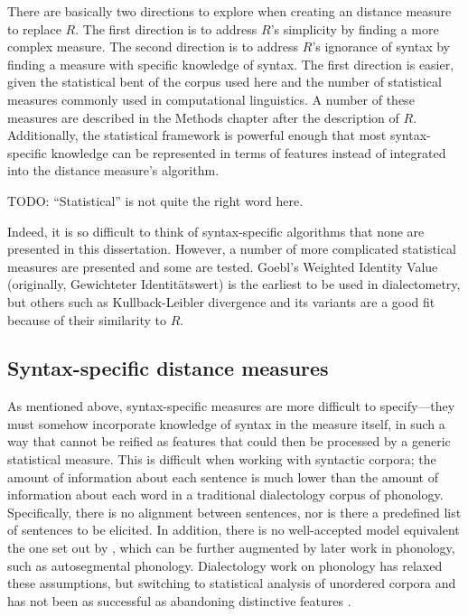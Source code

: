 There are basically two directions to explore when creating an
distance measure to replace $R$. The first direction is to address
$R$'s simplicity by finding a more complex measure. The second
direction is to address $R$'s ignorance of syntax by finding a measure
with specific knowledge of syntax. The first direction is easier,
given the statistical bent of the corpus used here and the number of
statistical measures commonly used in computational
linguistics. A number of these measures are described in the Methods
chapter after the description of $R$.
Additionally, the statistical framework is powerful
enough that most syntax-specific knowledge can be represented in terms
of features instead of integrated into the distance measure's
algorithm.

TODO: ``Statistical'' is not quite the right word here.

Indeed, it is so difficult to think of syntax-specific algorithms that
none are presented in this dissertation. However, a number of more
complicated statistical measures are presented and some are tested. Goebl's
Weighted Identity Value (originally, Gewichteter Identit\"atswert) is
the earliest to be used in dialectometry, but others such as
Kullback-Leibler divergence and its variants are a good fit because of
their similarity to $R$.

\subsection{Syntax-specific distance measures}

As mentioned above, syntax-specific measures are more difficult to
specify---they must somehow incorporate knowledge of syntax in the
measure itself, in such a way that cannot be reified as features that
could then be processed by a generic statistical measure. This is
difficult when working with syntactic corpora; the amount of
information about each sentence is much lower than the amount of
information about each word in a traditional dialectology corpus of
phonology. Specifically, there is no alignment between sentences, nor is
there a predefined list of sentences to be elicited. In addition,
there is no well-accepted model equivalent the one set out by
, which can be further augmented by later work in
phonology, such as  autosegmental
phonology. Dialectology work on phonology has relaxed these
assumptions, but switching to statistical analysis of unordered
corpora \cite{sanders06} and \cite{hinrichs07} has not
been as successful as abandoning distinctive features \cite{heeringa04}.

